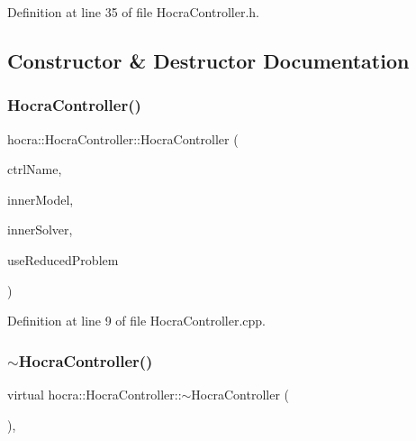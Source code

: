 Definition at line 35 of file Hocra\+Controller.\+h.



\subsection{Constructor \& Destructor Documentation}
\hypertarget{classhocra_1_1HocraController_a8f54b0542d7024b2c8c5e47d93c36523}{}\label{classhocra_1_1HocraController_a8f54b0542d7024b2c8c5e47d93c36523} 
\subsubsection{\texorpdfstring{Hocra\+Controller()}{HocraController()}}
{\footnotesize\ttfamily hocra\+::\+Hocra\+Controller\+::\+Hocra\+Controller (\begin{DoxyParamCaption}\item[{const std\+::string \&}]{ctrl\+Name,  }\item[{Model\+::\+Ptr}]{inner\+Model,  }\item[{One\+Level\+Solver\+::\+Ptr}]{inner\+Solver,  }\item[{bool}]{use\+Reduced\+Problem }\end{DoxyParamCaption})}



Definition at line 9 of file Hocra\+Controller.\+cpp.

\hypertarget{classhocra_1_1HocraController_aa87972322a67e8c7d3326e023aae44d0}{}\label{classhocra_1_1HocraController_aa87972322a67e8c7d3326e023aae44d0} 
\subsubsection{\texorpdfstring{$\sim$\+Hocra\+Controller()}{~HocraController()}}
{\footnotesize\ttfamily virtual hocra\+::\+Hocra\+Controller\+::$\sim$\+Hocra\+Controller (\begin{DoxyParamCaption}{ }\end{DoxyParamCaption})\hspace{0.3cm}{\ttfamily [inline]}, {\ttfamily [virtual]}}



